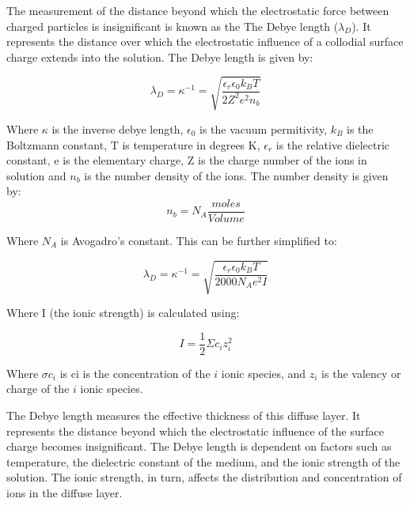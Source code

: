 The measurement of the distance beyond which the electrostatic force between charged particles is insignificant is known as the The Debye length ($\lambda_D$). It represents the distance over which the electrostatic influence of a collodial surface charge extends into the solution. The Debye length is given by:

\begin{equation}
\lambda_D = \kappa^{-1} = \sqrt{ \frac{ \epsilon_r \epsilon_0 k_B T}{2Z^2 e^2 n_b}}
\end{equation}

Where $\kappa$ is the inverse debye length,  $\epsilon_0$ is the vacuum permitivity, $k_B$ is the Boltzmann constant, T is temperature in degrees K, $\epsilon_r$ is the relative dielectric constant, e is the elementary charge, Z is the charge number of the ions in solution and $n_b$ is the number density of the ions. %
The number density is given by:
\begin{equation}
n_b = N_A \frac{moles} {Volume}
\end{equation}

Where $N_A$ is Avogadro's constant. This can be further simplified to:

\begin{equation}
 \lambda_D = \kappa^{-1} = \sqrt{ \frac{ \epsilon_r \epsilon_0 k_B T}{2000N_A e^2 I}}
\end{equation}

Where I (the ionic strength) is calculated using:

\begin{equation} 
I = \frac{1}{2} \Sigma c_i z_i^2
\end{equation}

Where $\sigma c_i$ is ci is the concentration of the $i$ ionic species, and $z_i$ is the valency or charge of the $i$ ionic species.

The Debye length measures the effective thickness of this diffuse layer. It represents the distance beyond which the electrostatic influence of the surface charge becomes insignificant. The Debye length is dependent on factors such as temperature, the dielectric constant of the medium, and the ionic strength of the solution. The ionic strength, in turn, affects the distribution and concentration of ions in the diffuse layer.

